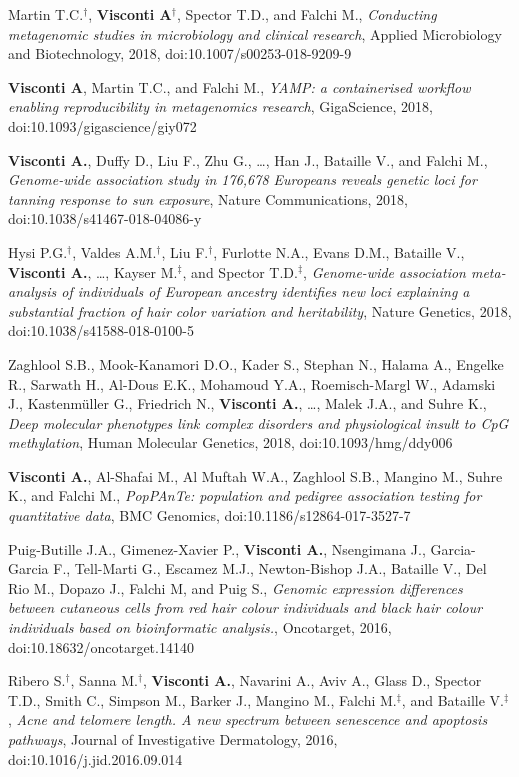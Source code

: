 \documentclass[a4paper,10pt]{article}
\begin{document}
{\begin{itemize}
		 Martin T.C.$^{\textbf{$\dag $}}$, \textbf{Visconti A}$^{\textbf{$\dag $}}$, Spector T.D., and Falchi M., \emph{Conducting metagenomic studies in microbiology and clinical research}, Applied Microbiology and Biotechnology, 2018, doi:10.1007/s00253-018-9209-9
		
		 \textbf{Visconti A}, Martin T.C., and Falchi M., \emph{YAMP: a containerised workflow enabling reproducibility in metagenomics research}, GigaScience, 2018, doi:10.1093/gigascience/giy072	
		
		 \textbf{Visconti A.}, Duffy D., Liu F., Zhu G., \dots, Han J., Bataille V., and Falchi M., \emph{Genome-wide association study in 176,678 Europeans reveals genetic loci for tanning response to sun exposure}, Nature Communications, 2018, doi:10.1038/s41467-018-04086-y
		
		 Hysi P.G.$^{\textbf{$\dag $}}$, Valdes A.M.$^{\textbf{$\dag $}}$, Liu F.$^{\textbf{$\dag $}}$, Furlotte N.A., Evans D.M., Bataille V., \textbf{Visconti A.}, \dots, Kayser M.$^{\textbf{$\ddag $}}$, and Spector T.D.$^{\textbf{$\ddag $}}$, \emph{Genome-wide association meta-analysis of individuals of European ancestry identifies new loci explaining a substantial fraction of hair color variation and heritability}, Nature Genetics, 2018, doi:10.1038/s41588-018-0100-5
		
		 Zaghlool S.B., Mook-Kanamori D.O., Kader S., Stephan N., Halama A., Engelke R., Sarwath H., Al-Dous E.K., Mohamoud Y.A., Roemisch-Margl W., Adamski J., Kastenmüller G., Friedrich N., \textbf{Visconti A.}, \dots, Malek J.A., and Suhre K., \emph{Deep molecular phenotypes link complex disorders and physiological insult to CpG methylation}, Human Molecular Genetics, 2018, doi:10.1093/hmg/ddy006
				
		 \textbf{Visconti A.}, Al-Shafai M.,  Al Muftah W.A.,  Zaghlool S.B., Mangino M., Suhre K., and Falchi M., \emph{PopPAnTe: population and pedigree association testing for quantitative data}, BMC Genomics, doi:10.1186/s12864-017-3527-7			
				
		 Puig-Butille J.A., Gimenez-Xavier P., \textbf{Visconti A.}, Nsengimana J., Garcia-Garcia F., Tell-Marti G., Escamez M.J., Newton-Bishop J.A., Bataille V., Del Rio M., Dopazo J., Falchi M, and Puig S., \emph{Genomic expression differences between cutaneous cells from red hair colour individuals and black hair colour individuals based on bioinformatic analysis.}, Oncotarget, 2016, doi:10.18632/oncotarget.14140
		
		 Ribero S.$^{\textbf{$\dag $}}$, Sanna M.$^{\textbf{$\dag $}}$, \textbf{Visconti A.}, Navarini A., Aviv A., Glass D., Spector T.D., Smith C., Simpson M., Barker J., Mangino M., Falchi M.$^{\textbf{$\ddag $}}$, and Bataille V.$^{\textbf{$\ddag $}}$, \emph{Acne and telomere length. A new spectrum between senescence and apoptosis pathways}, Journal of Investigative Dermatology, 2016, doi:10.1016/j.jid.2016.09.014

		\end{itemize}
	}
\end{document}
